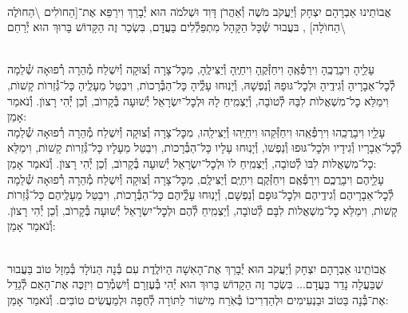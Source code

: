 \documentclass[twoside, openany, parskip=half, 11pt]{book}
\begin{document}
\begin{small}

\\
אֲבוֹתֵינוּ אַבְרָהָם יִצְחָק וְ֯יַעֲקֹב מֹשֶׁה וְ֯אַהֲרֹן דָּוִד וּשְׁלֹמֹה הוּא יְ֯בָרֵךְ וִירַפֵּא אֶת־[הַחוׂלִים \textbackslash הַחוׂלֶה \textbackslash הַחוׂלָה]
,
בּעֲבוּר שְׁ֯כָּל הַקָּהָל מִתְפַּלְ֯לִים בַּעֲדָם, בִּשְׂכַר זֶה
הַקָּדוֹשׁ בָּרוּךְ הוּא יְ֯רַחֵם
\setcolumnwidth{1.4in,1.4in,1.4in}
\begin{paracol}{3}
\\
עָלֵָיהָ וִיבָרֲכֶֽהָ וִירַפְּ֯אֶֽהָ וִיחַזְּ֯קֶֽהָ וִיחַיֶּֽהָ וְ֯יַצִּילֶֽהָ, מִכׇּל־צָרָה וְ֯צוּקָה וְ֯יִשְׁלַח מְ֯הֵרָה רְ֯פוּאָה שְׁ֯לֵמָה לְ֯כׇל־אֵבָרָיהָ וְ֯גִידֶֽיהָ וּלְכׇל־גּוּפָהּ וְ֯נַפְשָׁהּ, וְ֯יָנֽוּחוּ עָלְֶ֯יהָ כָּל־הַבְּ֯רָכוׂת, וִיבַטֵּל מֵעָלֶֽיהָ כָּל־גְּ֯זֵרוׂת קָשׁוׂת, וִימַלֵּא כׇל־מִשְׁאֲלוׂת לִבָּהּ לְ֯טוׂבָה, וְ֯יַצְמִֽיחַ לָהּ וּלְכׇל־יִשְׂרָאֵל יְ֯שׁוּעָה בְּ֯קָרוׂב, וְ֯כֵן יְ֯הִי רָצוׂן. וְ֯נֹאמַר אָמֵן:
\switchcolumn
{}\\
עָלֵָיו וִיבָרֲכֵֽהוּ וִירַפְּ֯אֵֽהוּ וִיחַזְּ֯קֵהוּ וִיחַיֵּֽהוּ וְ֯יַצִּילֵֽהוּ, מִכׇּל־צָרָה וְ֯צוּקָה וְ֯יִשְׁלַח מְ֯הֵרָה רְ֯פוּאָה שְׁ֯לֵמָה לְ֯כׇל־אֵבָרָיו וְ֯גִידָיו וּלְכׇל־גּוּפוּ וְ֯נַפְשׁוׂ, וְ֯יָנֽוּחוּ עָלָיו כָּל־הַבְּ֯רָכוׂת, וִיבַטֵּל מֵעָלָיו כָּל־גְּ֯זֵרוׂת קָשׁוׂת, וִימַלֵּא כׇל־מִשְׁאֲלוׂת לִבּוׂ לְ֯טוׂבָה, וְ֯יַצְמִֽיחַ לוׂ וּלְכׇל־יִשְׂרָאֵל יְ֯שׁוּעָה בְּ֯קָרוׂב, וְ֯כֵן יְ֯הִי רָצוׂן. וְ֯נֹאמַר אָמֵן:
\switchcolumn
{}\\
עָלֵָיהֶם וִיבָרֲכְֶם וִירַפְּ֯אֶֽם וִיחַזְּ֯קֶֽם וִיחַיֶּֽם וְ֯יַצִּילֶֽם, מִכׇּל־צָרָה וְ֯צוּקָה וְ֯יִשְׁלַח מְ֯הֵרָה רְ֯פוּאָה שְׁ֯לֵמָה לְ֯כׇל־אֵבָרָיהֶם וְ֯גִידֶֽיהֶם וּלְכׇל־גּוּפָם וְ֯נַפְשָׁם, וְ֯יָנֽוּחוּ עָלְֶ֯יהֶם כָּל־הַבְּ֯רָכוׂת, וִיבַטֵּל מֵעָלֶֽיהֶם כָּל־גְּ֯זֵרוׂת קָשׁוׂת, וִימַלֵּא כׇל־מִשְׁאֲלוׂת לִבָּם לְ֯טוׂבָה, וְ֯יַצְמִֽיחַ לְ֯הֶם וּלְכׇל־יִשְׂרָאֵל יְ֯שׁוּעָה בְּ֯קָרוׂב, וְ֯כֵן יְ֯הִי רָצוׂן. וְ֯נֹאמַר אָמֵן:
\end{paracol}

\vspace{\baselineskip}

\\
אֲבוֹתֵֽינוּ אַבְרָהָם יִצְחָק וְ֯יַעֲקֹב הוּא יְ֯בָרֵךְ אֶת־הָאִשָׁה הַיוֹלֶֽדֶת
עִם בְּ֯נָה הַנוֹלָד בְּ֯מַזָל טוֹב בַּעֲבוּר שֶׁבַּעֲלָה נָדַר בַּעֲדָם... בִּשְׂכַר זֶה הַקָדוֹשׁ בָּרוּךְ הוּא יְ֯הִי בְּ֯עֶזְרָם וְ֯יִשְׁמְ֯רֵם וִיזַכֶּה אֶת־הָאֵם לְ֯גַדֵל אֶת־בְּ֯נָה בַּטוֹב וּבַנְעִימִים וּלְהַדְרִיכוֹ בְּ֯אֹֽרַח מִישׁוֹר לַתּוֹרָה לְ֯חֻפָּה וּלְמַעֲשִׂים טוֹבִים. וְ֯נֹאמַר אָמֵן:


\end{small}
\end{document}

